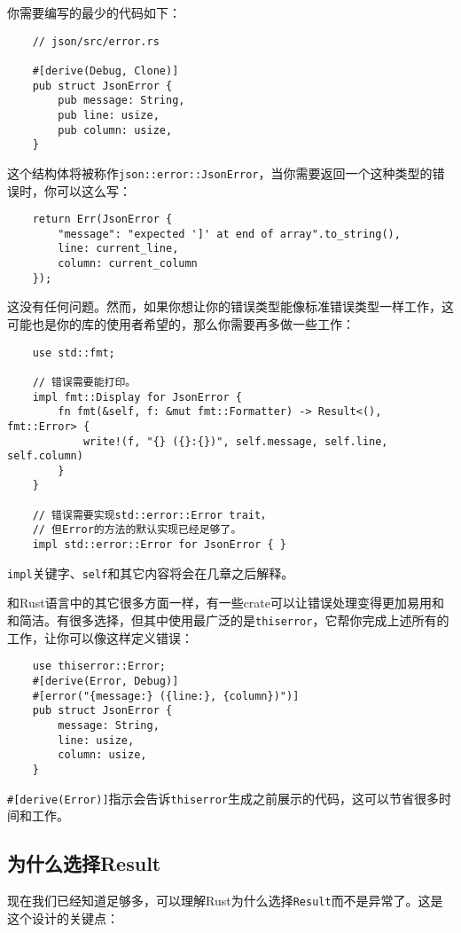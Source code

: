你需要编写的最少的代码如下：
\begin{verbatim}
    // json/src/error.rs

    #[derive(Debug, Clone)]
    pub struct JsonError {
        pub message: String,
        pub line: usize,
        pub column: usize,
    }
\end{verbatim}

这个结构体将被称作\texttt{json::error::JsonError}，当你需要返回一个这种类型的错误时，你可以这么写：
\begin{verbatim}
    return Err(JsonError {
        "message": "expected ']' at end of array".to_string(),
        line: current_line,
        column: current_column
    });
\end{verbatim}

这没有任何问题。然而，如果你想让你的错误类型能像标准错误类型一样工作，这可能也是你的库的使用者希望的，那么你需要再多做一些工作：
\begin{verbatim}
    use std::fmt;

    // 错误需要能打印。
    impl fmt::Display for JsonError {
        fn fmt(&self, f: &mut fmt::Formatter) -> Result<(), fmt::Error> {
            write!(f, "{} ({}:{})", self.message, self.line, self.column)
        }
    }

    // 错误需要实现std::error::Error trait，
    // 但Error的方法的默认实现已经足够了。
    impl std::error::Error for JsonError { }
\end{verbatim}

\texttt{impl}关键字、\texttt{self}和其它内容将会在几章之后解释。

和Rust语言中的其它很多方面一样，有一些crate可以让错误处理变得更加易用和和简洁。有很多选择，但其中使用最广泛的是\texttt{thiserror}，它帮你完成上述所有的工作，让你可以像这样定义错误：
\begin{verbatim}
    use thiserror::Error;
    #[derive(Error, Debug)]
    #[error("{message:} ({line:}, {column})")]
    pub struct JsonError {
        message: String,
        line: usize,
        column: usize,
    }
\end{verbatim}

\texttt{\#[derive(Error)]}指示会告诉\texttt{thiserror}生成之前展示的代码，这可以节省很多时间和工作。

\subsection{为什么选择Result}
现在我们已经知道足够多，可以理解Rust为什么选择\texttt{Result}而不是异常了。这是这个设计的关键点：


